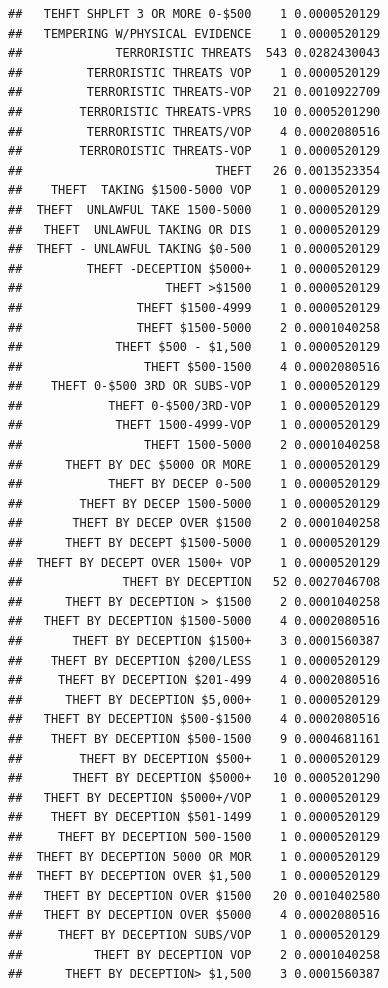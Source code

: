 \documentclass[]{book}
\begin{document}
\begin{verbatim}
##   TEHFT SHPLFT 3 OR MORE 0-$500    1 0.0000520129
##   TEMPERING W/PHYSICAL EVIDENCE    1 0.0000520129
##             TERRORISTIC THREATS  543 0.0282430043
##         TERRORISTIC THREATS VOP    1 0.0000520129
##         TERRORISTIC THREATS-VOP   21 0.0010922709
##        TERRORISTIC THREATS-VPRS   10 0.0005201290
##         TERRORISTIC THREATS/VOP    4 0.0002080516
##        TERROROISTIC THREATS-VOP    1 0.0000520129
##                           THEFT   26 0.0013523354
##    THEFT  TAKING $1500-5000 VOP    1 0.0000520129
##  THEFT  UNLAWFUL TAKE 1500-5000    1 0.0000520129
##   THEFT  UNLAWFUL TAKING OR DIS    1 0.0000520129
##  THEFT - UNLAWFUL TAKING $0-500    1 0.0000520129
##         THEFT -DECEPTION $5000+    1 0.0000520129
##                    THEFT >$1500    1 0.0000520129
##                THEFT $1500-4999    1 0.0000520129
##                THEFT $1500-5000    2 0.0001040258
##             THEFT $500 - $1,500    1 0.0000520129
##                 THEFT $500-1500    4 0.0002080516
##    THEFT 0-$500 3RD OR SUBS-VOP    1 0.0000520129
##            THEFT 0-$500/3RD-VOP    1 0.0000520129
##             THEFT 1500-4999-VOP    1 0.0000520129
##                 THEFT 1500-5000    2 0.0001040258
##      THEFT BY DEC $5000 OR MORE    1 0.0000520129
##            THEFT BY DECEP 0-500    1 0.0000520129
##        THEFT BY DECEP 1500-5000    1 0.0000520129
##       THEFT BY DECEP OVER $1500    2 0.0001040258
##      THEFT BY DECEPT $1500-5000    1 0.0000520129
##  THEFT BY DECEPT OVER 1500+ VOP    1 0.0000520129
##              THEFT BY DECEPTION   52 0.0027046708
##      THEFT BY DECEPTION > $1500    2 0.0001040258
##   THEFT BY DECEPTION $1500-5000    4 0.0002080516
##       THEFT BY DECEPTION $1500+    3 0.0001560387
##    THEFT BY DECEPTION $200/LESS    1 0.0000520129
##     THEFT BY DECEPTION $201-499    4 0.0002080516
##      THEFT BY DECEPTION $5,000+    1 0.0000520129
##   THEFT BY DECEPTION $500-$1500    4 0.0002080516
##    THEFT BY DECEPTION $500-1500    9 0.0004681161
##        THEFT BY DECEPTION $500+    1 0.0000520129
##       THEFT BY DECEPTION $5000+   10 0.0005201290
##   THEFT BY DECEPTION $5000+/VOP    1 0.0000520129
##    THEFT BY DECEPTION $501-1499    1 0.0000520129
##     THEFT BY DECEPTION 500-1500    1 0.0000520129
##  THEFT BY DECEPTION 5000 OR MOR    1 0.0000520129
##  THEFT BY DECEPTION OVER $1,500    1 0.0000520129
##   THEFT BY DECEPTION OVER $1500   20 0.0010402580
##   THEFT BY DECEPTION OVER $5000    4 0.0002080516
##     THEFT BY DECEPTION SUBS/VOP    1 0.0000520129
##          THEFT BY DECEPTION VOP    2 0.0001040258
##      THEFT BY DECEPTION> $1,500    3 0.0001560387

\end{verbatim}
\end{document}

